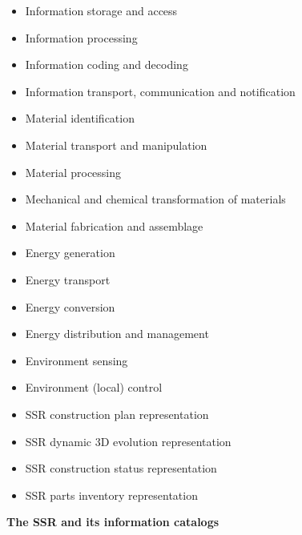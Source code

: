 \bigskip

\begin{itemize}
\item Information storage and access
\item Information processing
\item Information coding and decoding
\item Information transport, communication and notification
\end{itemize}

\bigskip

\begin{itemize}
\item Material identification
\item Material transport and manipulation
\item Material processing
\item Mechanical and chemical transformation of materials
\item Material fabrication and assemblage
\end{itemize}

\bigskip

\begin{itemize}
\item Energy generation
\item Energy transport
\item Energy conversion
\item Energy distribution and management
\end{itemize}

\bigskip

\begin{itemize}
\item Environment sensing
\item Environment (local) control
\end{itemize}

\bigskip

\begin{itemize}
\item SSR construction plan representation
\item SSR dynamic 3D evolution representation
\item SSR construction status representation
\item SSR parts inventory representation
\end{itemize}

\bigskip


\bigskip

{\bfseries
\hypertarget{RefHeading3110306210128}{}The SSR and its information
catalogs}

